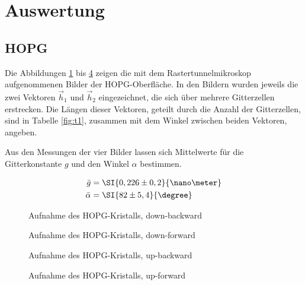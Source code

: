 \section{Auswertung}
\subsection{HOPG}

Die Abbildungen \ref{fig:down-backward} bis \ref{fig:up-forward} zeigen die mit dem Rastertunnelmikroskop aufgenommenen Bilder der HOPG-Oberfläche.
In den Bildern wurden jeweils die zwei Vektoren $\vec{h}_1$ und $\vec{h}_2$ eingezeichnet, die sich über mehrere Gitterzellen erstrecken.
Die Längen dieser Vektoren, geteilt durch die Anzahl der Gitterzellen, sind in Tabelle \ref{fig:t1}, zusammen mit dem Winkel zwischen beiden Vektoren, angeben.

Aus den Messungen der vier Bilder lassen sich Mittelwerte für die Gitterkonstante $g$ und den Winkel $\alpha$ bestimmen.

\begin{align}
	\bar{g} &= \SI{0,226 \pm 0,2}{\nano \meter}\\
	\bar{\alpha} &= \SI{82 \pm 5,4}{\degree}
\end{align}

\begin{figure}
	\centering
	\resizebox{12cm}{!}{
		
	}
	\caption{Aufnahme des HOPG-Kristalls, down-backward}
	\label{fig:down-backward}
\end{figure}

\begin{figure}
	\centering
	\resizebox{12cm}{!}{
		
	}
	\caption{Aufnahme des HOPG-Kristalls, down-forward}
	\label{fig:down-forward}
\end{figure}

\begin{figure}
	\centering
	\resizebox{12cm}{!}{
		
	}
	\caption{Aufnahme des HOPG-Kristalls, up-backward}
	\label{fig:up-backward}
\end{figure}

\begin{figure}
	\centering
	\resizebox{12cm}{!}{
		
	}
	\caption{Aufnahme des HOPG-Kristalls, up-forward}
	\label{fig:up-forward}
\end{figure}

